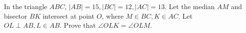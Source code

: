 In the triangle $ABC$,  $|AB|=15,|BC|=12,|AC|=13$. Let the median $AM$ and bisector $BK$ intersect at point $O$,  where $M\in BC,K\in AC$. Let $OL\perp AB,L\in AB$. Prove that $\angle OLK=\angle OLM$.
